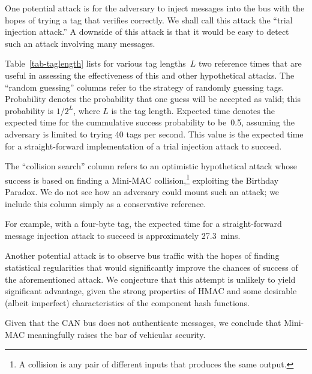One potential attack is for the adversary to inject messages into the bus with the hopes
of trying a tag that verifies correctly.  We shall call this attack the ``trial injection attack.''
A downside of this attack is that it would be easy to detect such an attack involving
many messages.

Table~\ref{tab-taglength} lists for various tag lengths~$L$
two reference times that are useful in assessing the effectiveness of this and other hypothetical attacks.
The ``random guessing'' columns refer to the strategy of randomly guessing tags.
Probability denotes the probability that one guess will be accepted as valid; this probability
is $1/2^{L}$, where $L$ is the tag length.
Expected time denotes the expected time for the cummulative success probability to be~0.5,
assuming the adversary is limited to trying 40 tags per second.
This value is the expected time for a straight-forward 
implementation of a trial injection attack to succeed.  

The ``collision search'' column refers to an optimistic hypothetical attack whose success is based on
finding a Mini-MAC collision,\footnote{A collision is any pair of 
different inputs that produces the same output.}
exploiting the Birthday Paradox.  
We do not see how an adversary could mount such an attack;
we include this column simply as a conservative reference.

For example, with a four-byte tag, the expected time for a straight-forward 
message injection attack to succeed is approximately 27.3~mins.  

Another potential attack is to observe bus traffic with the hopes of finding statistical
regularities that would significantly improve the chances of success of the aforementioned attack.
We conjecture that this attempt is unlikely to yield significant advantage, given the
strong properties of HMAC and some
desirable (albeit imperfect) characteristics of the component hash functions.

Given that the CAN bus does not authenticate messages, we conclude that Mini-MAC
meaningfully raises the bar of vehicular security.

